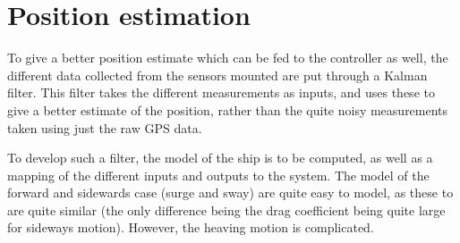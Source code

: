 \section{Position estimation}
To give a better position estimate which can be fed to the controller as well, the different data collected from the sensors mounted are put through a Kalman filter. This filter takes the different measurements as inputs, and uses these to give a better estimate of the position, rather than the quite noisy measurements taken using just the raw \ac{GPS} data. 

To develop such a filter, the model of the ship is to be computed, as well as a mapping of the different inputs and outputs to the system. The model of the forward and sidewards case (surge and sway) are quite easy to model, as these to are quite similar (the only difference being the drag coefficient being quite large for sideways motion). However, the heaving motion is complicated. 

